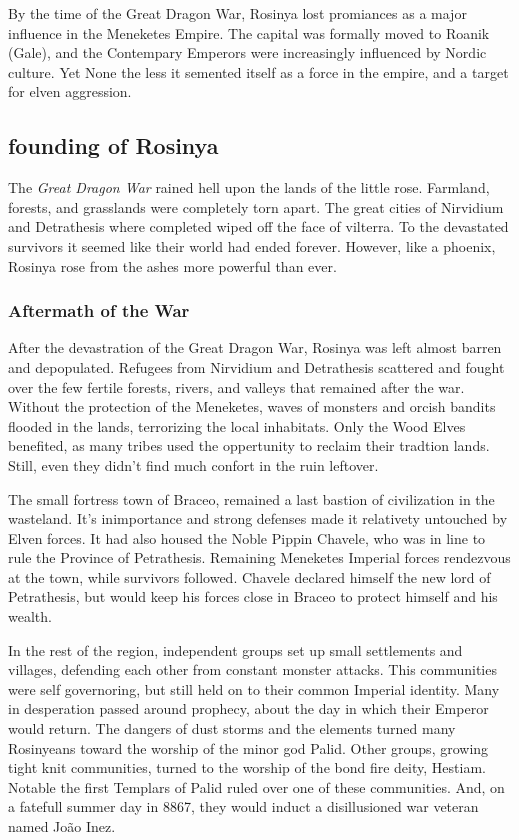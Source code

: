 \documentclass[../main.tex]{subfiles}
\begin{document}
By the time of the Great Dragon War, Rosinya lost promiances as a major influence in the Meneketes Empire. The capital
was formally moved to Roanik (Gale), and the Contempary Emperors were increasingly influenced by Nordic culture. Yet 
None the less it semented itself as a force in the empire, and a target for elven aggression. 

\subsection{founding of Rosinya}
The \emph{Great Dragon War} rained hell upon the lands of the little rose. Farmland, forests, 
and grasslands were completely torn apart. The great cities of Nirvidium and Detrathesis where 
completed wiped off the face of vilterra. To the devastated survivors it seemed like their 
world had ended forever. However, like a phoenix, Rosinya rose from the ashes more powerful 
than ever.

\subsubsection{Aftermath of the War}
After the devastration of the Great Dragon War, Rosinya was left almost barren and depopulated. Refugees 
from Nirvidium and Detrathesis scattered and fought over the few fertile forests, rivers, and valleys that
remained after the war. Without the protection of the Meneketes, waves of monsters and orcish bandits flooded 
in the lands, terrorizing the local inhabitats. Only the Wood Elves benefited, as many tribes used the oppertunity 
to reclaim their tradtion lands. Still, even they didn't find much confort in the ruin leftover. 

The small fortress town of Braceo, remained a last bastion of civilization in the wasteland. It's inimportance
and strong defenses made it relativety untouched by Elven forces. It had also housed the Noble Pippin Chavele,
who was in line to rule the Province of Petrathesis. Remaining Meneketes Imperial forces rendezvous 
at the town, while survivors followed. Chavele declared himself the new lord of Petrathesis, but would keep his 
forces close in Braceo to protect himself and his wealth. 

In the rest of the region, independent groups set up small settlements and villages, defending each other from
constant monster attacks. This communities were self governoring, but still held on to their common Imperial 
identity. Many in desperation passed around prophecy, about the day in which their Emperor would return. 
The dangers of dust storms and the elements turned many Rosinyeans toward the worship of the minor god
Palid. Other groups, growing tight knit communities, turned to the worship of the bond fire deity, Hestiam.
Notable the first Templars of Palid ruled over one of these communities. And, on a fatefull summer day in 8867,
they would induct a disillusioned war veteran named João Inez. 
\end{document}
